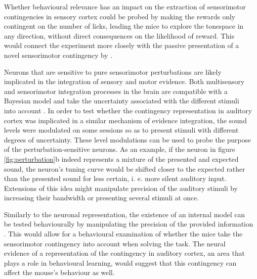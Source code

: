 \documentclass[]{report}
\theoremstyle{definition}
\theoremstyle{definition}
\theoremstyle{definition}
\theoremstyle{remark}
\begin{document}
Whether behavioural relevance has an impact on the extraction of
sensorimotor contingencies in sensory cortex could be probed by making
the rewards only contingent on the number of licks, leading the mice to
explore the tonespace in any direction, without direct consequences on
the likelihood of reward. This would connect the experiment more closely
with the passive presentation of a novel sensorimotor contingency by
\citet{schneider2018cortical}.

Neurons that are sensitive to pure sensorimotor perturbations are likely
implicated in the integration of sensory and motor evidence. Both
multisensory and sensorimotor integration processes in the brain are
compatible with a Bayesian model and take the uncertainty associated
with the different stimuli into account
\citep{wolpert1995internal, kording2004force, kording2004bayesian, oreilly2012bayesian}.
In order to test whether the contingency representation in auditory
cortex was implicated in a similar mechanism of evidence integration,
the sound levels were modulated on some sessions so as to present
stimuli with different degrees of uncertainty. These level modulations
can be used to probe the purpose of the perturbation-sensitive neurons.
As an example, if the neuron in figure \ref{fig:perturbation}b indeed
represents a mixture of the presented and expected sound, the neuron's
tuning curve would be shifted closer to the expected rather than the
presented sound for less certain, i. e. more silent auditory input.
Extensions of this idea might manipulate precision of the auditory
stimuli by increasing their bandwidth or presenting several stimuli at
once.

Similarly to the neuronal representation, the existence of an internal
model can be tested behaviourally by manipulating the precision of the
provided information \citep{wolpert1995internal}. This would allow for a
behavioural examination of whether the mice take the sensorimotor
contingency into account when solving the task. The neural evidence of a
representation of the contingency in auditory cortex, an area that plays
a role in behavioural learning, would suggest that this contingency can
affect the mouse's behaviour as well.
\end{document}

